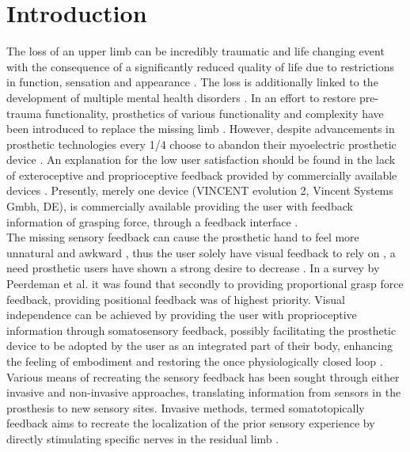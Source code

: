 \chapter{Introduction}

The loss of an upper limb can be incredibly traumatic and life changing event with the consequence of a significantly reduced quality of life due to restrictions in function, sensation and appearance \cite{Schofield2014,Ostlie2011}. The loss is additionally linked to the development of multiple mental health disorders \cite{Ostlie2011}.
In an effort to restore pre-trauma functionality, prosthetics of various functionality and complexity have been introduced to replace the missing limb \cite{Geethanjali2016}. However, despite advancements in prosthetic technologies every 1/4 choose to abandon their myoelectric prosthetic device \cite{Biddiss2007a}. An explanation for the low user satisfaction should be found in the lack of exteroceptive and proprioceptive feedback provided by commercially available devices \cite{Peerdeman2011}. Presently, merely one device (VINCENT evolution 2, Vincent Systems Gmbh, DE), is commercially available providing the user with feedback information of grasping force, through a feedback interface \cite{Systems2005}. \\    
%
The missing sensory feedback can cause the prosthetic hand to feel more unnatural and awkward \cite{Pamungkas2015}, thus the user solely have visual feedback to rely on \cite{Stephens-Fripp2018,Pamungkas2015}, a need prosthetic users have shown a strong desire to decrease \cite{Atkins1996}. In a survey by Peerdeman et al. \cite{Peerdeman2011} it was found that secondly to providing proportional grasp force feedback, providing positional feedback was of highest priority. Visual independence can be achieved by providing the user with proprioceptive information through somatosensory feedback, possibly facilitating the prosthetic device to be adopted by the user as an integrated part of their body, enhancing the feeling of embodiment and restoring the once physiologically closed loop \cite{Stephens-Fripp2018,Xu2016,Strbac2016,Geng2012}. \\
%
Various means of recreating the sensory feedback has been sought through either invasive and non-invasive approaches, translating information from sensors in the prosthesis to new sensory sites. Invasive methods, termed somatotopically feedback aims to recreate the localization of the prior sensory experience by directly stimulating specific nerves in the residual limb \cite{Schofield2014,Stephens-Fripp2018}.
